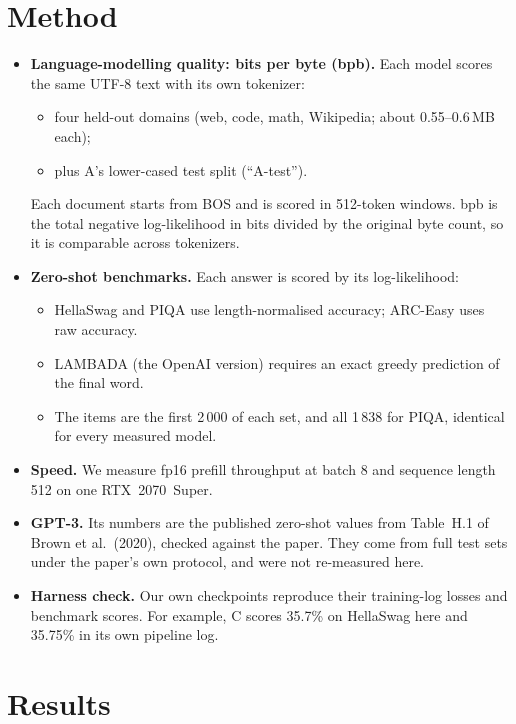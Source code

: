 \documentclass[10pt,a4paper]{article}
\begin{document}
\section{Method}

\begin{itemize}
  \item \textbf{Language-modelling quality: bits per byte (bpb).} Each model scores the same UTF-8 text with its own tokenizer:
    \begin{itemize}
      \item four held-out domains (web, code, math, Wikipedia; about 0.55--0.6\,MB each);
      \item plus A's lower-cased test split (``A-test'').
    \end{itemize}
    Each document starts from BOS and is scored in 512-token windows. bpb is the total negative log-likelihood in bits divided by the original byte count, so it is comparable across tokenizers.
  \item \textbf{Zero-shot benchmarks.} Each answer is scored by its log-likelihood:
    \begin{itemize}
      \item HellaSwag and PIQA use length-normalised accuracy; ARC-Easy uses raw accuracy.
      \item LAMBADA (the OpenAI version) requires an exact greedy prediction of the final word.
      \item The items are the first 2\,000 of each set, and all 1\,838 for PIQA, identical for every measured model.
    \end{itemize}
  \item \textbf{Speed.} We measure fp16 prefill throughput at batch 8 and sequence length 512 on one RTX~2070~Super.
  \item \textbf{GPT-3.} Its numbers are the published zero-shot values from Table~H.1 of Brown et al.\ (2020), checked against the paper. They come from full test sets under the paper's own protocol, and were not re-measured here.
  \item \textbf{Harness check.} Our own checkpoints reproduce their training-log losses and benchmark scores. For example, C scores 35.7\% on HellaSwag here and 35.75\% in its own pipeline log.
\end{itemize}

\section{Results}
\end{document}
